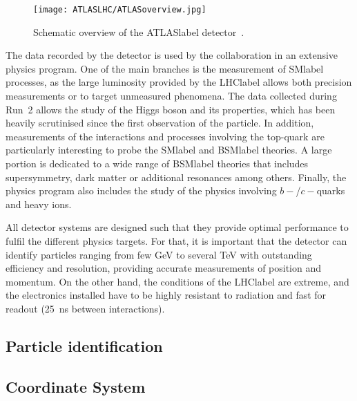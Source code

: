 \begin{figure}[htbp]
    \RawFloats
    \begin{center}
    \texttt{[image: ATLASLHC/ATLASoverview.jpg]}
    \caption{
        Schematic overview of the \acrshort{ATLASlabel} detector~\cite{Collaboration_2008}. 
    }
    \label{figLHC:ATLAS}
    \end{center}
\end{figure}

The data recorded by the detector is used by the collaboration in an extensive physics program. One of the main branches is the measurement of \acrshort{SMlabel} processes, as the large luminosity provided by the \acrshort{LHClabel} allows both precision measurements or to target unmeasured phenomena. The data collected during Run~2 allows the study of the Higgs boson and its properties, which has been heavily scrutinised since the first observation of the particle. In addition, measurements of the interactions and processes involving the top-quark are particularly interesting to probe the \acrshort{SMlabel} and \acrshort{BSMlabel} theories. A large portion is dedicated to a wide range of \acrshort{BSMlabel} theories that includes supersymmetry, dark matter or additional resonances among others. Finally, the physics program also includes the study of the physics involving $b-$/$c-$quarks and heavy ions.

All detector systems are designed such that they provide optimal performance to fulfil the different physics targets. For that, it is important that the detector can identify particles ranging from few GeV to several TeV with outstanding efficiency and resolution, providing accurate measurements of position and momentum. On the other hand, the conditions of the \acrshort{LHClabel} are extreme, and the electronics installed have to be highly resistant to radiation and fast for readout (25~ns between interactions).

\subsection{Particle identification}

\subsection{Coordinate System}

